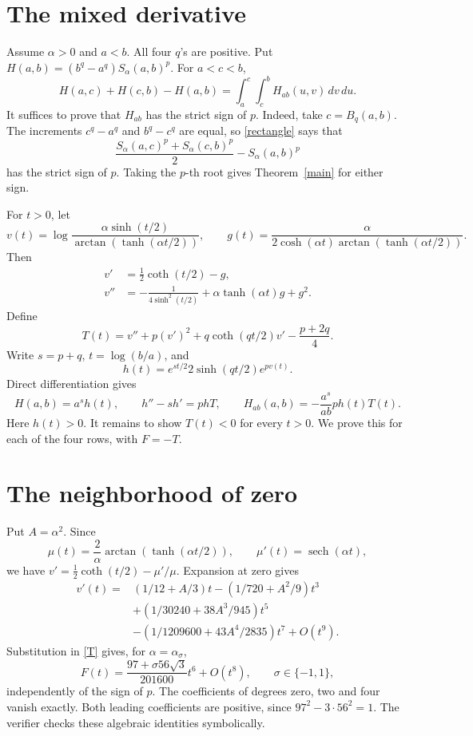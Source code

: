 \documentclass[11pt]{article}
\begin{document}
\section*{The mixed derivative}
Assume \(\alpha>0\) and \(a<b\). All four \(q\)'s are positive.
Put \(H(a,b)=(b^q-a^q)S_\alpha(a,b)^p\).
For \(a<c<b\),
\begin{equation}\label{rectangle}
 H(a,c)+H(c,b)-H(a,b)
 =\int_a^c\int_c^b H_{ab}(u,v)\,dv\,du.
\end{equation}
It suffices to prove that \(H_{ab}\) has the strict sign of \(p\).
Indeed, take \(c=B_q(a,b)\). The increments \(c^q-a^q\) and
\(b^q-c^q\) are equal, so \eqref{rectangle} says that
\[
 \frac{S_\alpha(a,c)^p+S_\alpha(c,b)^p}{2}
       -S_\alpha(a,b)^p
\]
has the strict sign of \(p\). Taking the \(p\)-th root gives
Theorem~\ref{main} for either sign.

For \(t>0\), let
\[
 v(t)=\log\frac{\alpha\sinh(t/2)}
                    {\arctan(\tanh(\alpha t/2))},\qquad
 g(t)=\frac{\alpha}
 {2\cosh(\alpha t)\arctan(\tanh(\alpha t/2))}.
\]
Then
\begin{align}
 v'&=\tfrac12\coth(t/2)-g,\label{v1}\\
 v''&=-\frac1{4\sinh^2(t/2)}
       +\alpha\tanh(\alpha t)g+g^2.\label{v2}
\end{align}
Define
\begin{equation}\label{T}
 T(t)=v''+p(v')^2+q\coth(qt/2)v'-\frac{p+2q}{4}.
\end{equation}
Write \(s=p+q\), \(t=\log(b/a)\), and
\[
 h(t)=e^{st/2}2\sinh(qt/2)e^{pv(t)}.
\]
Direct differentiation gives
\[
 H(a,b)=a^s h(t),\qquad
 h''-s h'=p hT,\qquad
 H_{ab}(a,b)=-\frac{a^s}{ab}p h(t)T(t).
\]
Here \(h(t)>0\). It remains to show \(T(t)<0\) for every \(t>0\).
We prove this for each of the four rows, with \(F=-T\).

\section*{The neighborhood of zero}
Put \(A=\alpha^2\). Since
\[
 \mu(t)=\frac2\alpha\arctan(\tanh(\alpha t/2)),
 \qquad \mu'(t)=\operatorname{sech}(\alpha t),
\]
we have \(v'=\tfrac12\coth(t/2)-\mu'/\mu\).
Expansion at zero gives
\begin{align*}
 v'(t)={}&(1/12+A/3)t-(1/720+A^2/9)t^3\\
 &+(1/30240+38A^3/945)t^5\\
 &-(1/1209600+43A^4/2835)t^7+O(t^9).
\end{align*}
Substitution in \eqref{T} gives, for \(\alpha=\alpha_\sigma\),
\begin{equation}\label{leading}
 F(t)=\frac{97+\sigma56\sqrt3}{201600}t^6+O(t^8),
 \qquad \sigma\in\{-1,1\},
\end{equation}
independently of the sign of \(p\). The coefficients of degrees
zero, two and four vanish exactly. Both leading coefficients are
positive, since \(97^2-3\cdot56^2=1\).
The verifier checks these algebraic identities symbolically.
\end{document}
